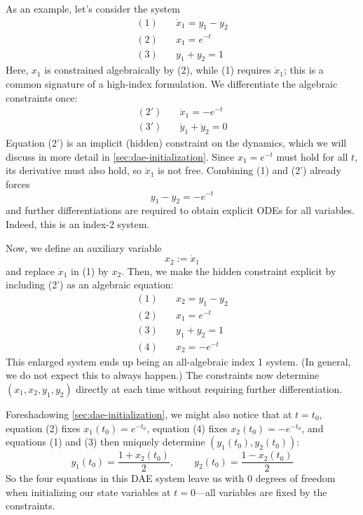 As an example, let's consider the system
\begin{align}
    (1)\quad & \dot x_1 = y_1 - y_2 \\
    (2)\quad & x_1 = e^{-t} \\
    (3)\quad & y_1 + y_2 = 1
\end{align}
Here, $x_1$ is constrained algebraically by (2), while (1) requires $\dot x_1$; this is a common signature of a high-index formulation. We differentiate the algebraic constraints once:
\begin{align}
    (2')\quad & \dot x_1 = -e^{-t} \\
    (3')\quad & \dot y_1 + \dot y_2 = 0
\end{align}
Equation (2') is an implicit (hidden) constraint on the dynamics, which we will discuss in more detail in \autoref{sec:dae-initialization}. Since $x_1=e^{-t}$ must hold for all $t$, its derivative must also hold, so $\dot x_1$ is not free. Combining (1) and (2') already forces
\begin{equation}
y_1 - y_2 = -e^{-t}
\end{equation}
and further differentiations are required to obtain explicit ODEs for all variables. Indeed, this is an index-2 system. 

Now, we define an auxiliary variable
\begin{equation}
    x_2 := \dot x_1
\end{equation}
and replace $\dot x_1$ in (1) by $x_2$. Then, we make the hidden constraint explicit by including (2') as an algebraic equation:
\begin{align}
    (1)\quad & x_2 = y_1 - y_2 \\
    (2)\quad & x_1 = e^{-t} \\
    (3)\quad & y_1 + y_2 = 1 \\
    (4)\quad & x_2 = -e^{-t}
\end{align}
This enlarged system ends up being an all-algebraic index 1 system. (In general, we do not expect this to always happen.) The constraints now determine $(x_1,x_2,y_1,y_2)$ directly at each time without requiring further differentiation.

Foreshadowing \autoref{sec:dae-initialization}, we might also notice that at $t=t_0$, equation (2) fixes $x_1(t_0)=e^{-t_0}$, equation (4) fixes $x_2(t_0)=-e^{-t_0}$, and equations (1) and (3) then uniquely determine $(y_1(t_0),y_2(t_0))$:
\begin{equation}
y_1(t_0)=\frac{1+x_2(t_0)}{2},\qquad
y_2(t_0)=\frac{1-x_2(t_0)}{2}
\end{equation}
So the four equations in this DAE system leave us with $0$ degrees of freedom when initializing our state variables at $t=0$---all variables are fixed by the constraints.

